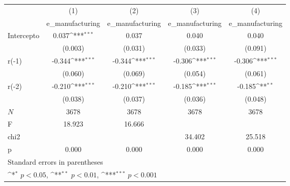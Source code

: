 {
\def\sym#1{\ifmmode^{#1}\else\(^{#1}\)\fi}
\begin{longtable}{l*{4}{c}}
\hline\hline\endfirsthead\hline\endhead\hline\endfoot\endlastfoot
            &\multicolumn{1}{c}{(1)}&\multicolumn{1}{c}{(2)}&\multicolumn{1}{c}{(3)}&\multicolumn{1}{c}{(4)}\\
            &\multicolumn{1}{c}{e\_manufacturing}&\multicolumn{1}{c}{e\_manufacturing}&\multicolumn{1}{c}{e\_manufacturing}&\multicolumn{1}{c}{e\_manufacturing}\\
\hline
Intercepto  &       0.037\sym{***}&       0.037         &       0.040         &       0.040         \\
            &     (0.003)         &     (0.031)         &     (0.033)         &     (0.091)         \\
r(-1)       &      -0.344\sym{***}&      -0.344\sym{***}&      -0.306\sym{***}&      -0.306\sym{***}\\
            &     (0.060)         &     (0.069)         &     (0.054)         &     (0.061)         \\
r(-2)       &      -0.210\sym{***}&      -0.210\sym{***}&      -0.185\sym{***}&      -0.185\sym{**} \\
            &     (0.038)         &     (0.037)         &     (0.036)         &     (0.048)         \\
\hline
\(N\)       &        3678         &        3678         &        3678         &        3678         \\
F           &      18.923         &      16.666         &                     &                     \\
chi2        &                     &                     &      34.402         &      25.518         \\
p           &       0.000         &       0.000         &       0.000         &       0.000         \\
\hline\hline
\multicolumn{5}{l}{\footnotesize Standard errors in parentheses}\\
\multicolumn{5}{l}{\footnotesize \sym{*} \(p<0.05\), \sym{**} \(p<0.01\), \sym{***} \(p<0.001\)}\\
\end{longtable}
}
